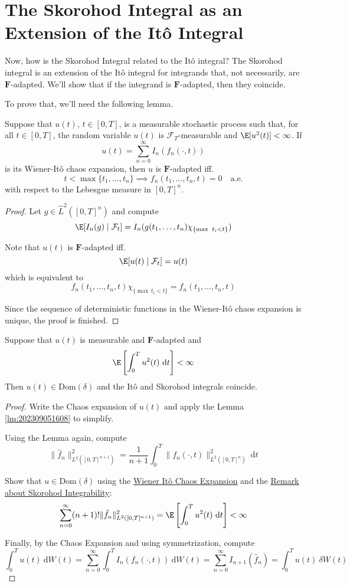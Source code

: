 \section{The Skorohod Integral as an Extension of the Itô Integral}

Now, how is the Skorohod Integral related to the Itô integral? The Skorohod integral is an extension of the Itô integral for integrands that, not necessarily, are $\mathbf{F}$-adapted. We'll show that if the integrand is $\mathbf{F}$-adapted, then they coincide.

To prove that, we'll need the following lemma.

\begin{lemma}\label{lm:202309051608}
Suppose that $u(t)$, $t \in [0,T]$, is a measurable stochastic process such that, for all $t \in [0,T]$, the random variable $u(t)$ is $\mathcal{F}_T$-measurable and $\E[u^ 2(t)] <\infty$. If 
$$
u(t) = \sum_{n=0}^\infty I_n(f_n(\cdot, t))
$$
is its Wiener-Itô chaos expansion, then $u$ is $\mathbf{F}$-adapted iff.
$$
t < \max \{ t_1, \ldots, t_n \} \implies f_n(t_1, \ldots, t_n, t) = 0 \quad \text{a.e.}
$$
with respect to the Lebesgue measure in $[0,T]^n$.
\end{lemma}

\begin{proof} 
Let $g \in \hat{L}^2([0,T]^n)$ and compute
$$
\E[I_n(g) \mid \mathcal{F}_t] = I_n(g(t_1, \ldots, t_n) \chi_{\{ \max ~t_i < t \}})
$$

Note that $u(t)$ is $\mathbf{F}$-adapted iff.
$$
\E[u(t) \mid \mathcal{F}_t] = u(t)
$$
which is equivalent to 
$$
f_n(t_1, \ldots, t_n, t) \chi_{\{ \max ~t_i < t \}} = f_n(t_1, \ldots, t_n, t)
$$

Since the sequence of deterministic functions in the Wiener-Itô chaos expansion is unique, the proof is finished.
\end{proof}

\begin{theorem}
Suppose that $u(t)$ is measurable and $\mathbf{F}$-adapted and 
$$
\E \left[ \int_0^T u^2(t) ~\mathrm{d}t \right] < \infty
$$
Then $u(t) \in \text{Dom}(\delta)$ and the Itô and Skorohod integrals coincide.
\end{theorem}

\begin{proof}
Write the Chaos expansion of $u(t)$ and apply the Lemma \ref{lm:202309051608} to simplify.

Using the Lemma again, compute  
$$
\| \hat{f}_n \|_{L^2([0,T]^{n+1})}^2 = \frac{1}{n+1} \int_0^T \| f_n(\cdot, t) \|_{L^2([0,T]^n)}^2 ~\mathrm{d}t 
$$

Show that $u \in \text{Dom}(\delta)$ using the \hyperref[thm:chaos-expansion]{Wiener Itô Chaos Expansion} and the \hyperref[rmk:202309060706]{Remark about Skorohod Integrability}:
$$
\sum_{n=0}^\infty (n+1)! \| \hat{f}_n \|_{L^2([0,T]^{n+1})}^2 = \E \left[ \int_0^T u^2(t) ~\mathrm{d}t \right] < \infty
$$

Finally, by the Chaos Expansion and using symmetrization, compute
$$
\int_0^T u(t)~\mathrm{d}W(t) = \sum_{n=0}^\infty \int_0^T I_n(f_n(\cdot, t)) ~\mathrm{d}W(t) = \sum_{n=0}^\infty I_{n+1}(\hat{f}_n) = \int_0^T u(t) ~\delta W(t)
$$
\end{proof}
